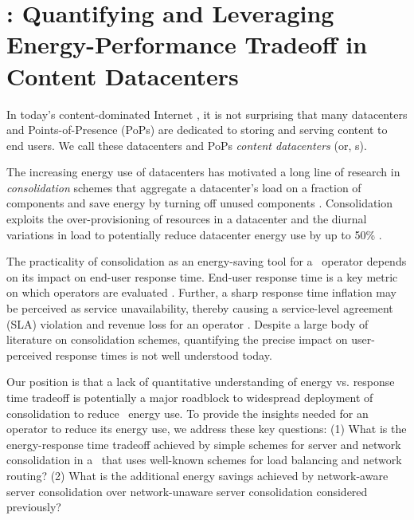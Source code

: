 \chapter{\shrink: Quantifying and Leveraging Energy-Performance Tradeoff in Content Datacenters}
\label{ch:shrink}

In today's content-dominated Internet \cite{cisco-videogrowth, nielsen-video-growth}, it is not surprising that many datacenters and Points-of-Presence (PoPs) are dedicated to storing and serving content to end users. We call these datacenters and PoPs {\em content datacenters} (or, \cdc s).


The increasing energy use of datacenters \cite{GreenbergCost, rasmussen2011determining, power-cost} has motivated a long line of research in \emph{consolidation} schemes that aggregate a datacenter's load on a fraction of components and save energy by turning off unused components \cite{chase2001managing, mathew12, rajamani2003evaluating, lin12}.
Consolidation exploits the over-provisioning of resources in a datacenter and the diurnal variations in load to potentially reduce datacenter energy use by up to 50\% \cite{mathew12}.


The practicality of consolidation as an energy-saving tool for a \cdc\ operator depends on its impact on end-user response time. End-user response time is a key metric on which  operators are evaluated \cite{comparingCDN}. Further, a sharp response time inflation may be perceived as service unavailability, thereby causing a service-level agreement (SLA) violation and revenue loss for an operator \cite{amazonSLA, microsoftSLA, hpSLA}. Despite a large body of literature on consolidation schemes, quantifying the precise impact on user-perceived response times is not well understood today.

Our position is that a lack of quantitative understanding of energy vs. response time tradeoff is potentially a major roadblock to widespread deployment of consolidation to reduce \cdc\ energy use. To provide the insights needed for an operator to reduce its energy use, we address these key questions: (1) What is the energy-response time tradeoff achieved by simple schemes for server and network consolidation in a \cdc\ that uses well-known schemes for load balancing and network routing? (2) What is the additional energy savings achieved by network-aware server consolidation over network-unaware server consolidation considered previously?

